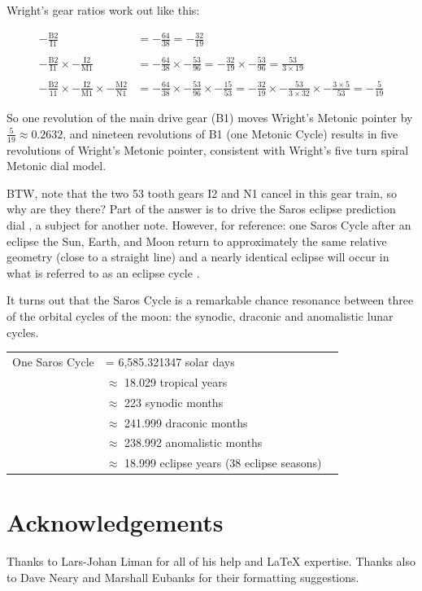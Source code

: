 \documentclass[11pt, oneside]{article}   	%
\theoremstyle{definition}
\begin{document}
\bigskip
\bigskip
\noindent
Wright's  gear ratios work out like this:

\bigskip
\begin{equation*}
\begin{array}{lllll}
- \frac{\text{B2}}{\text{I1}} &= - \frac{64}{38} = - \frac{32}{19}                                                                                                                                                              \\ \\
-\frac{\text{B2}}{\text{I1}} \times -\frac{\text{I2}}{\text{M1}} &= - \frac{64}{38} \times - \frac{53}{96} = - \frac{32}{19} \times - \frac{53}{96} = \frac{53}{3 \times 19}  \\ \\
- \frac{\text{B2}}{\text{11}} \times -\frac{\text{I2}}{\text{M1}} \times - \frac{\text{M2}}{\text{N1}} &= - \frac{64}{38} \times - \frac{53}{96} \times - \frac{15}{53} 
=  -\frac{32}{19} \times - \frac{53}{3 \times 32} \times - \frac{3 \times 5}{53} = - \frac{5}{19}
\end{array}
\end{equation*}

\bigskip
\bigskip
\noindent
So one revolution of the main drive gear (B1) moves Wright's Metonic pointer by $\frac{5}{19} \approx 0.2632$, and nineteen revolutions of B1 (one Metonic Cycle) results in five
revolutions of Wright's Metonic pointer, consistent with Wright's five turn spiral Metonic dial model.


\bigskip
\noindent
BTW, note that the two 53 tooth gears I2 and N1 cancel in this gear train, so why are they there? 
Part of the answer is to drive the Saros eclipse prediction dial \cite{pmid25075747}, a subject for another note. 
However,  for reference: one Saros Cycle after an eclipse the Sun, Earth, and Moon return to approximately the same 
relative geometry (close to a straight line) and a nearly identical eclipse will occur in what is referred to as an eclipse 
cycle \cite{wiki:saros}. 

\bigskip
\noindent
It turns out that the Saros Cycle is a remarkable chance resonance between three of the orbital cycles of the moon: the synodic, draconic and anomalistic 
lunar cycles.

\begin{flushleft}
\begin{tabular}{@{}l@{\ }l@{\qquad}l}
  One Saros Cycle
  & =                6,585.321347 solar days      \\
  & $\approx$ 18.029  tropical years            \\            
  & $\approx$ 223 synodic months               \\
  & $\approx$ 241.999 draconic months      \\
  & $\approx$ 238.992 anomalistic months  \\
  & $\approx$ 18.999 eclipse years (38 eclipse seasons)
\end{tabular}
\end{flushleft}

\bigskip
\section*{Acknowledgements}

Thanks to Lars-Johan Liman for all of his help and LaTeX expertise. Thanks also to Dave Neary and Marshall Eubanks for their formatting suggestions.



\end{document}
